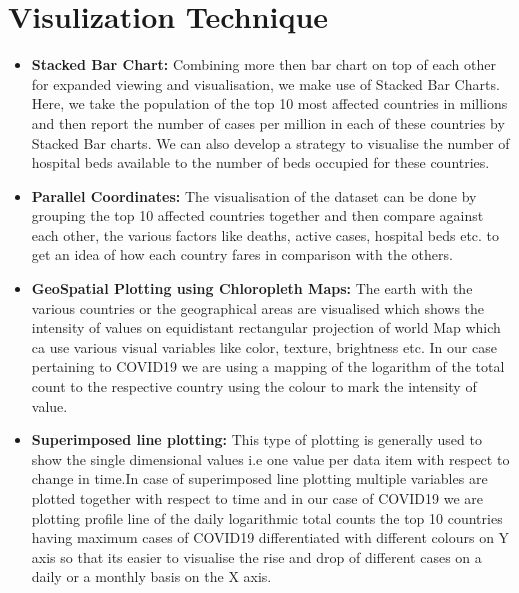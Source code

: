 \documentclass[10pt]{article}
\begin{document}
\section{Visulization Technique}
\begin{itemize}
    \item \textbf{Stacked Bar Chart:} Combining more then bar chart on top of each other for expanded viewing and visualisation, we make use of Stacked Bar Charts. Here, we take the population of the top 10 most affected countries in millions and then report the number of cases per million in each of these countries by Stacked Bar charts. We can also develop a strategy to visualise the number of hospital beds available to the number of beds occupied for these countries.
    \item \textbf{Parallel Coordinates:} The visualisation of the dataset can be done by grouping the top 10 affected countries together and then compare against each other, the various factors like deaths, active cases, hospital beds etc. to get an idea of how each country fares in comparison with the others.
    \item \textbf{GeoSpatial Plotting using Chloropleth Maps:} The earth with the various countries or the geographical areas are visualised which shows the intensity of values on equidistant rectangular projection of world Map which ca use various visual variables like color, texture, brightness etc. In our case pertaining to COVID19 we are using a mapping of the logarithm of the total count to the respective country using the colour to mark the intensity of value.
    \item \textbf{Superimposed line plotting:} This type of plotting is generally used to show the single dimensional values i.e one value per data item with respect to change in time.In case of superimposed line plotting multiple variables are plotted together with respect to time and in our case of COVID19 we are plotting profile line of the daily logarithmic total counts the top 10 countries having maximum cases of COVID19 differentiated with different colours on Y axis so that its easier to visualise the rise and drop of different cases on a daily or a monthly basis on the X axis.
\end{itemize}
\end{document}
